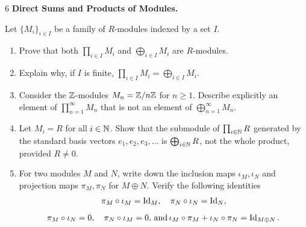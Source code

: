 \documentclass[Notebook.tex]{subfiles}
\begin{document}
    \begin{problem}{6}
        \textbf{Direct Sums and Products of Modules.} 
        
        Let $\{M_{i}\}_{i\in I}$ be a family of $R$-modules indexed by a set $I$. 
        \begin{enumerate}
        \item Prove that both $\prod_{i\in I} M_{i}$ and $\bigoplus_{i\in I}M_{i}$ are $R$-modules. 
        \item Explain why, if $I$ is finite, $\prod_{i \in I} M_{i} = \bigoplus_{i \in I} M_i$. 
        \item Consider the $\mathbb Z$-modules $M_{n}=\mathbb Z/n\mathbb Z$ for $n\geq 1$. Describe explicitly an element of $\prod_{n=1}^{\infty}M_{n}$ that is not an element of $\bigoplus_{n=1}^{\infty}M_{n}$.
        \item Let $M_i=R$ for all $i\in \mathbb N$. Show that the submodule of $\prod_{i\in \mathbb N}R$ generated by the standard basis vectors $e_1,e_2,e_3,\ldots$ is $\bigoplus_{i\in \mathbb N}R$, not the whole product, provided $R\neq 0$.
        \item For two modules $M$ and $N$, write down the inclusion maps $\iota_M,\iota_N$ and projection maps $\pi_M,\pi_N$ for $M\oplus N$. Verify the following identities
        \[
        \pi_M \circ \iota_M=\operatorname{Id}_M,
        \quad 
        \pi_N \circ \iota_N=\operatorname{Id}_N,\]
        \[
        \pi_M \circ \iota_N=0,
        \quad
        \pi_N \circ \iota_M=0,
        \, 
        \text{and}
        \, 
        \iota_M\circ \pi_M+\iota_N\circ \pi_N=\operatorname{Id}_{M\oplus N}.
        \]
        \end{enumerate}
    \end{problem}
\end{document}
